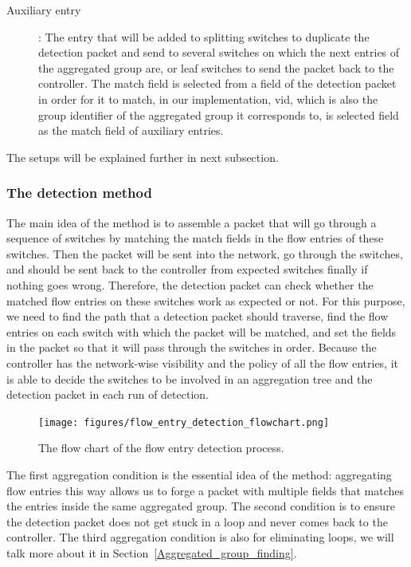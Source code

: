 \documentclass[conference]{IEEEtran}
\begin{document}
\begin{description}
\item 
[Auxiliary entry]:
The entry that will be added to splitting switches to duplicate the detection packet and send to several  switches on which the next entries of the aggregated group are, or leaf switches to send the packet back to the controller. The match field is selected from a field of the detection packet in order for it to match, in our implementation, vid, which is also the group identifier of the aggregated group it corresponds to, is selected field as the match field of auxiliary entries.
\end{description}

The setups will be explained further in next subsection.

\subsubsection{The detection method}
\label{Detection_method}

The main idea of the method is to assemble a packet that will go through a sequence of switches by matching the match fields in the flow entries of these switches. Then the packet will be sent into the network, go through the switches, and should be sent back to the controller from expected switches finally if nothing goes wrong. Therefore, the detection packet can check whether the matched flow entries on these switches work as expected or not. For this purpose, we need to find the path that a detection packet should traverse, find the flow entries on each switch with which the packet will be matched, and set the fields in the packet so that it will pass through the switches in order. Because the controller has the network-wise visibility and the policy of all the flow entries, it is able to decide the switches to be involved in an aggregation tree and the detection packet in each run of detection. 

\begin{figure}[ht]
\centering
\texttt{[image: figures/flow\_entry\_detection\_flowchart.png]}
\caption{The flow chart of the flow entry detection process.}
\label{flow_entry_detection_flowchart}
\end{figure}

The first aggregation condition is the essential idea of the method: aggregating flow entries this way allows us to forge a packet with multiple fields that matches the entries inside the same aggregated group. The second condition is to ensure the detection packet does not get stuck in a loop and never comes back to the controller. The third aggregation condition is also for eliminating loops, we will talk more about it in Section~\ref{Aggregated_group_finding}.
\end{document}
